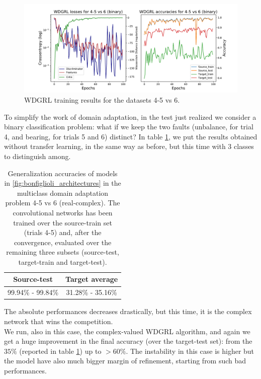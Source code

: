 \documentclass[../main.tex]{subfiles}
\begin{document}
\begin{figure}[!ht]
	\centering
	\includegraphics[width=\textwidth]{pictures/wdgrl_results_456_binary}
	\caption{WDGRL training results for the datasets 4-5 vs 6.}
	\label{fig:wdgrl_results_456_binary}
\end{figure}
To simplify the work of domain adaptation, in the test just realized we consider a binary classification problem: what if we keep the two faults (unbalance, for trial 4, and bearing, for trials 5 and 6) distinct? In table \ref{tab:bonfiglioli_multiclass_generalization_456}, we put the results obtained without transfer learning, in the same way as before, but this time with 3 classes to distinguish among.
\begin{table}[!ht]
	\centering
	\begin{tabular}{c | c}
		\toprule
		\textbf{Source-test} & \textbf{Target average}\\
		\midrule
		99.94\% - 99.84\% & 31.28\% - 35.16\% \\
		\bottomrule
	\end{tabular}
	\caption{Generalization accuracies of models in \ref{fig:bonfiglioli_architectures} in the multiclass domain adaptation problem 4-5 vs 6 (real-complex). The convolutional networks has been trained over the source-train set (trials 4-5) and, after the convergence, evaluated over the remaining three subsets (source-test, target-train and target-test).}
	\label{tab:bonfiglioli_multiclass_generalization_456}
\end{table}
The absolute performances decreases drastically, but this time, it is the complex network that wins the competition.\\
We run, also in this case, the complex-valued WDGRL algorithm, and again we get a huge improvement in the final accuracy (over the target-test set): from the $35\%$ (reported in table \ref{tab:bonfiglioli_multiclass_generalization_456}) up to $>60\%$. The instability in this case is higher but the model have also much bigger margin of refinement, starting from such bad performances.
\end{document}
